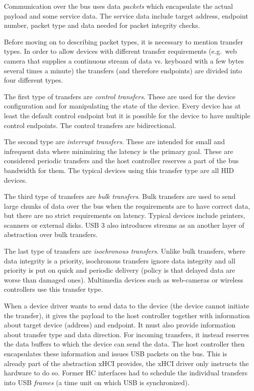 Communication over the bus uses data \textit{packets} which encapsulate the
actual payload and some service data. The service data include target address,
endpoint number, packet type and data needed for packet integrity checks.

Before moving on to describing packet types, it is necessary to mention
transfer types. In order to allow devices with different transfer requirements
(e.g.\ web camera that supplies a continuous stream of data vs. keyboard with
a few bytes several times a minute) the transfers (and therefore endpoints) are
divided into four different types.

The first type of transfers are \textit{control transfers}. These are used for
the device configuration and for manipulating the state of the device. Every
device has at least the default control endpoint but it is possible for the
device to have multiple control endpoints. The control transfers are
bidirectional.

The second type are \textit{interrupt transfers}. These are intended for small
and infrequent data where minimizing the latency is the primary goal. These are
considered periodic transfers and the host controller reserves a part of the
bus bandwidth for them. The typical devices using this transfer type are all
HID devices.

The third type of transfers are \textit{bulk transfers}. Bulk transfers are
used to send large chunks of data over the bus when the requirements are to
have correct data, but there are no strict requirements on latency. Typical
devices include printers, scanners or external disks. USB 3 also introduces
streams as an another layer of abstraction over bulk transfers.

The last type of transfers are \textit{isochronous transfers}. Unlike bulk
transfers, where data integrity is a priority, isochronous transfers ignore
data integrity and all priority is put on quick and periodic delivery (policy
is that delayed data are worse than damaged ones). Multimedia devices such as
web-cameras or wireless controllers use this transfer type.

When a device driver wants to send data to the device (the device cannot
initiate the transfer), it gives the payload to the host controller together
with information about target device (address) and endpoint. It must also
provide information about transfer type and data direction. For incoming
transfers, it instead reserves the data buffers to which the device can send
the data. The host controller then encapsulates these information and issues
USB packets on the bus. This is already part of the abstraction xHCI provides,
the xHCI driver only instructs the hardware to do so. Former HC interfaces had
to schedule the individual transfers into USB \emph{frames} (a time unit on
which USB is synchronized).


